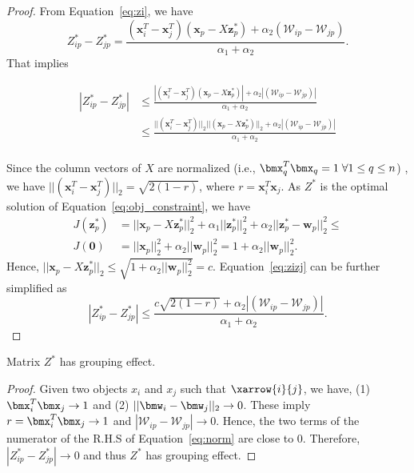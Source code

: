 \begin{proof}
From Equation~\ref{eq:zi}, we have 
\begin{equation}
\nonumber
Z_{ip}^*-Z_{jp}^* = \frac{(\bm{x}_i^T - \bm{x}_j^T)(\bm{x}_p-X\bm{z}_p^*) + \alpha_2 (\mathcal{W}_{ip}-\mathcal{W}_{jp})}{\alpha_1+\alpha_2}.
\end{equation}
That implies 
\begin{small}
\begin{equation}
\label{eq:zizj}
\begin{split}
|Z_{ip}^*-Z_{jp}^*| & \leq \frac{|(\bm{x}_i^T - \bm{x}_j^T)(\bm{x}_p-X\bm{z}_p^*)| + \alpha_2 |(\mathcal{W}_{ip}-\mathcal{W}_{jp})|}{\alpha_1+\alpha_2}\\
& \leq \frac{||(\bm{x}_i^T - \bm{x}_j^T)||_2||(\bm{x}_p-X\bm{z}_p^*)||_2 + \alpha_2 |(\mathcal{W}_{ip}-\mathcal{W}_{jp})|}{\alpha_1+\alpha_2}\\
\end{split}
\end{equation}
\end{small}

Since the column vectors of $X$ are normalized (i.e., $\bmx_q^T \bmx_q = 1 \; \forall 1 \leq q \leq n$) , we have
$||(\bm{x}_i^T - \bm{x}_j^T)||_2 = \sqrt{2(1-r)}$,
where $r = \bm{x}_i^T\bm{x}_j$.
As $Z^*$ is the optimal solution of Equation~\ref{eq:obj_constraint}, we have
\begin{equation}
\begin{split}
J(\bm{z}_p^*) & = ||\bm{x}_p-X\bm{z}_p^*||_2^2 + \alpha_1 ||\bm{z}_p^*||_2^2 + \alpha_2 ||\bm{z}_p^*-\bm{w}_p||_2^2 \leq  \\
J(\bm{0}) & = ||\bm{x}_p||_2^2 + \alpha_2 ||\bm{w}_p||_2^2 = 1 + \alpha_2 ||\bm{w}_p||_2^2.
\end{split}
\end{equation}
Hence, $||\bm{x}_p-X\bm{z}_p^*||_2 \leq \sqrt{1 + \alpha_2 ||\bm{w}_p||_2^2} = c$.
Equation~\ref{eq:zizj} can be further simplified as
\begin{equation}
\nonumber
|Z_{ip}^*-Z_{jp}^*| \leq \frac{c\sqrt{2(1-r)}+ \alpha_2 |(\mathcal{W}_{ip}-\mathcal{W}_{jp})|}{\alpha_1+\alpha_2}.
\end{equation}
\end{proof}

\begin{lemma}
Matrix $Z^*$ has grouping effect.
\label{lemma:z-star}
\end{lemma}
\begin{proof}
Given two objects $x_i$ and $x_j$ such that $\xarrow{i}{j}$,
we have,  %
(1) $\bmx_i^T \bmx_j \rightarrow 1$ and (2) $||\bmw_{i}-\bmw_{j}||_2 \rightarrow 0$.
These imply
$r = \bmx_i^T \bmx_j \rightarrow 1$ and  $|\mathcal{W}_{ip}-\mathcal{W}_{jp}| \rightarrow 0$.
Hence, the two terms of the numerator of the R.H.S of Equation~\ref{eq:norm} are close to 0. 
Therefore, $|Z_{ip}^*-Z_{jp}^*| \rightarrow 0$ and thus $Z^*$ has grouping effect.
\end{proof}

